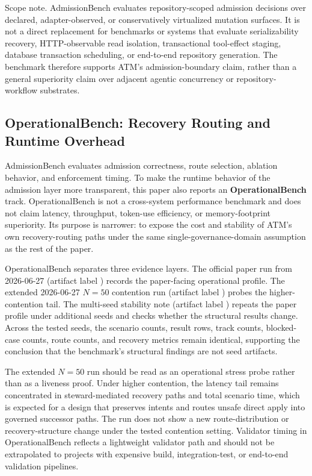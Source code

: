 \documentclass[9pt,letterpaper]{extarticle}
\begin{document}
Scope note. AdmissionBench evaluates repository-scoped admission decisions over declared, adapter-observed, or conservatively virtualized mutation surfaces. It is not a direct replacement for benchmarks or systems that evaluate serializability recovery, HTTP-observable read isolation, transactional tool-effect staging, database transaction scheduling, or end-to-end repository generation. The benchmark therefore supports ATM's admission-boundary claim, rather than a general superiority claim over adjacent agentic concurrency or repository-workflow substrates.

\subsection{OperationalBench: Recovery Routing and Runtime Overhead}

AdmissionBench evaluates admission correctness, route selection, ablation behavior, and enforcement timing. To make the runtime behavior of the admission layer more transparent, this paper also reports an \textbf{OperationalBench} track. OperationalBench is not a cross-system performance benchmark and does not claim latency, throughput, token-use efficiency, or memory-footprint superiority. Its purpose is narrower: to expose the cost and stability of ATM's own recovery-routing paths under the same single-governance-domain assumption as the rest of the paper.

OperationalBench separates three evidence layers. The official paper run from 2026-06-27 (artifact label \texttt{}) records the paper-facing operational profile. The extended 2026-06-27 $N = 50$ contention run (artifact label \texttt{}) probes the higher-contention tail. The multi-seed stability note (artifact label \texttt{}) repeats the paper profile under additional seeds and checks whether the structural results change. Across the tested seeds, the scenario counts, result rows, track counts, blocked-case counts, route counts, and recovery metrics remain identical, supporting the conclusion that the benchmark's structural findings are not seed artifacts.

The extended $N = 50$ run should be read as an operational stress probe rather than as a liveness proof. Under higher contention, the latency tail remains concentrated in steward-mediated recovery paths and total scenario time, which is expected for a design that preserves intents and routes unsafe direct apply into governed successor paths. The run does not show a new route-distribution or recovery-structure change under the tested contention setting. Validator timing in OperationalBench reflects a lightweight validator path and should not be extrapolated to projects with expensive build, integration-test, or end-to-end validation pipelines.
\end{document}
